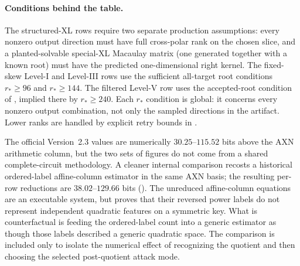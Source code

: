 \documentclass[11pt]{article}
\begin{document}
\paragraph{Conditions behind the table.}
The structured-XL rows require two separate production assumptions: every
nonzero output direction must have full cross-polar rank on the chosen slice,
and a planted-solvable special-XL Macaulay matrix (one generated together
with a known root) must have the predicted one-dimensional right kernel.  The fixed-skew Level-I and Level-III rows use
the sufficient all-target root conditions $r_*\ge96$ and $r_*\ge144$.  The
filtered Level-V row uses the accepted-root condition of
, implied there by $r_*\ge240$.  Each $r_*$ condition
is global: it concerns every nonzero output combination, not only the sampled
directions in the artifact.  Lower ranks are handled by explicit retry bounds
in .

\begin{center}
\end{center}

The official Version~2.3 values are numerically $30.25$--$115.52$ bits above
the AXN arithmetic column, but the two sets of figures do not come from a
shared complete-circuit methodology.  A cleaner internal comparison recosts a
historical ordered-label affine-column estimator in the same AXN basis; the
resulting per-row reductions are $38.02$--$129.66$ bits
().  The unreduced affine-column equations are an
executable system, but  proves that their reversed
power labels do not represent independent quadratic features on a symmetric
key.  What is counterfactual is feeding the ordered-label count into a generic
estimator as though those labels described a generic quadratic space.  The
comparison is included only to isolate the numerical effect of recognizing
the quotient and then choosing the selected post-quotient attack mode.
\end{document}
